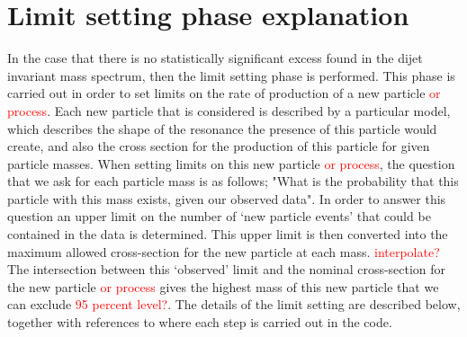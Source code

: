 \documentclass[UKenglish]{latex/atlasdoc}
\begin{document}
\section{Limit setting phase explanation}
\label{sec:limitexpl}
In the case that there is no statistically significant excess found in the dijet invariant mass spectrum, then the limit setting phase is performed. This phase is carried out in order to set limits on the rate of production of a new particle \textcolor{red}{ or process}. Each new particle that is considered is described by a particular model, which describes the shape of the resonance the presence of this particle would create, and also the cross section for the production of this particle for given particle masses. When setting limits on this new particle \textcolor{red}{or process}, the question that we ask for each particle mass is as follows; "What is the probability %
that this particle with this mass exists, given our observed data". In order to answer this question an upper limit on the number of `new particle events' that could be contained in the data is determined. This upper limit is then converted into the maximum allowed cross-section for the new particle at each mass. \textcolor{red}{interpolate?} The intersection between this `observed' limit and the nominal cross-section for the new particle \textcolor{red}{or process} gives the highest mass of this new particle that we can exclude \textcolor{red}{95 percent level?}. The details of the limit setting are described below, together with references to where each step is carried out in the code.  %
\end{document}
